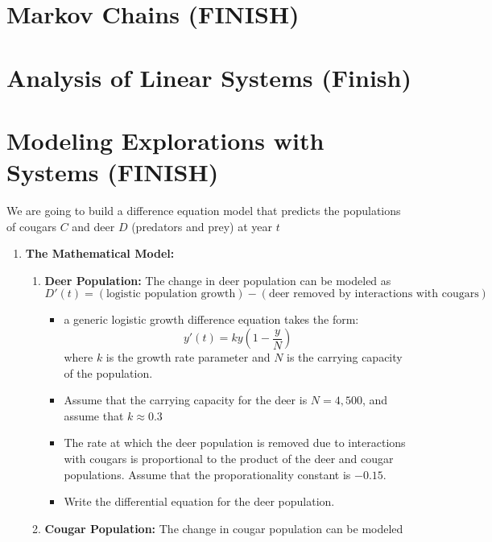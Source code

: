 \section{Markov Chains (FINISH)}

\section{Analysis of Linear Systems (Finish)}


\section{Modeling Explorations with Systems (FINISH)}
\begin{problem}
We are going to build a difference equation model that predicts the populations of cougars
$C$ and deer $D$ (predators and prey) at year $t$
\begin{enumerate}
    \item {\bf The Mathematical Model:} 
        \begin{enumerate}
            \item {\bf Deer Population:} The change in deer population can be modeled as 
                \[ D'(t) = (\text{logistic population growth}) - (\text{deer removed
                by interactions with cougars}) \]
                \begin{itemize}
                    \item a generic logistic growth difference equation takes the form: 
                        \[ y'(t) = k y \left(1-\frac{y}{N}\right) \]
                        where $k$ is the growth rate parameter and
                        $N$ is the carrying capacity of the population.
                    \item Assume that the carrying capacity for the deer is $N = 4,500$,
                        and assume that $k \approx 0.3$
                    \item The rate at which the deer population is removed due to
                        interactions with cougars is proportional to the product of the
                        deer and cougar populations.  Assume that the proporationality
                        constant is $-0.15$.
                    \item Write the differential equation for the deer population. 
                \end{itemize}
            \item {\bf Cougar Population:} The change in cougar population can be modeled

\end{enumerate}
\end{enumerate}
\end{problem}
